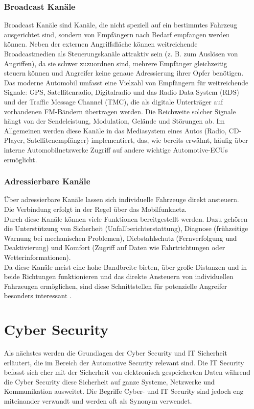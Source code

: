 \subsubsection{Broadcast Kanäle}
Broadcast Kanäle sind Kanäle, die nicht speziell auf ein bestimmtes Fahrzeug ausgerichtet sind, sondern von Empfängern nach Bedarf empfangen werden können. Neben der externen Angriffsfläche können weitreichende Broadcastmedien als Steuerungskanäle attraktiv sein (z. B. zum Auslösen von Angriffen), da sie schwer zuzuordnen sind, mehrere Empfänger gleichzeitig steuern können und Angreifer keine genaue Adressierung ihrer Opfer benötigen.
Das moderne Automobil umfasst eine Vielzahl von Empfängern für weitreichende Signale: \ac{GPS}, Satellitenradio, Digitalradio und das Radio Data System (RDS) und der Traffic Message Channel (TMC), die als digitale Unterträger auf vorhandenen FM-Bändern übertragen werden. Die Reichweite solcher Signale hängt von der Sendeleistung, Modulation, Gelände und Störungen ab. Im Allgemeinen werden diese Kanäle in das Mediasystem eines Autos (Radio, CD-Player, Satellitenempfänger) implementiert, das, wie bereits erwähnt, häufig über interne Automobilnetzwerke Zugriff auf andere wichtige Automotive-ECUs ermöglicht. \cite[4\psq]{Checkoway.2011}

\subsubsection{Adressierbare Kanäle}
Über adressierbare Kanäle lassen sich individuelle Fahrzeuge direkt ansteuern. Die Verbindung erfolgt in der Regel über das Mobilfunknetz.\\
Durch diese Kanäle können viele Funktionen bereitgestellt werden. Dazu gehören die Unterstützung von Sicherheit (Unfallberichterstattung), Diagnose (frühzeitige Warnung bei mechanischen Problemen), Diebstahlschutz (Fernverfolgung und Deaktivierung) und Komfort (Zugriff auf Daten wie Fahrtrichtungen oder Wetterinformationen). \cite[5]{Checkoway.2011} \\
Da diese Kanäle meist eine hohe Bandbreite bieten, über große Distanzen und in beide Richtungen funktionieren und das direkte Ansteuern von individuellen Fahrzeugen ermöglichen, sind diese Schnittstellen für potenzielle Angreifer besonders interessant \cite[5]{Checkoway.2011}.




\section{Cyber Security}
Als nächstes werden die Grundlagen der Cyber Security und IT Sicherheit erläutert, die im Bereich der Automotive Security relevant sind. Die IT Security befasst sich eher mit der Sicherheit von elektronisch gespeicherten Daten während die Cyber Security diese Sicherheit auf ganze Systeme, Netzwerke und Kommunikation ausweitet.
Die Begriffe Cyber- und IT Security sind jedoch eng miteinander verwandt und werden oft als Synonym verwendet. 


